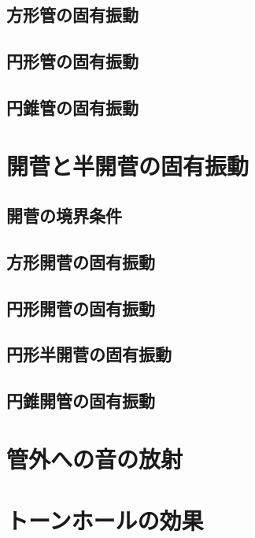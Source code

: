 \documentclass[a4paper,uplatex,dvipdfmx]{jsarticle}
\begin{document}
\subsection{方形管の固有振動}

\subsection{円形管の固有振動}

\subsection{円錐管の固有振動}


\section{開菅と半開菅の固有振動}

\subsection{開菅の境界条件}

\subsection{方形開菅の固有振動}

\subsection{円形開菅の固有振動}

\subsection{円形半開菅の固有振動}

\subsection{円錐開管の固有振動}


\section{管外への音の放射}


\section{トーンホールの効果}
\end{document}

